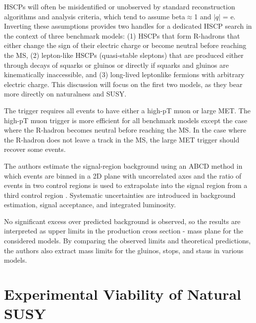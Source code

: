 \documentclass[12pt]{article}
\begin{document}
    HSCPs will often be misidentified or unobserved by standard reconstruction algorithms and analysis criteria, which tend to assume beta$\approx$1 and $|q|$ = e. Inverting these assumptions provides two handles for a dedicated HSCP search in the context of three benchmark models: (1) HSCPs that form R-hadrons that either change the sign of their electric charge or become neutral before reaching the MS, (2) lepton-like HSCPs (quasi-stable sleptons) that are produced either through decays of squarks or gluinos or directly if squarks and gluinos are kinematically inaccessible, and (3) long-lived leptonlike fermions with arbitrary electric charge. This discussion will focus on the first two models, as they bear more directly on naturalness and SUSY.

     

    The trigger requires all events to have either a high-pT muon or large MET. The high-pT muon trigger is more efficient for all benchmark models except the case where the R-hadron becomes neutral before reaching the MS. In the case where the R-hadron does not leave a track in the MS, the large MET trigger should recover some events.  

    The authors estimate the signal-region background using an ABCD method in which events are binned in a 2D plane with uncorrelated axes and the ratio of events in two control regions is used to extrapolate into the signal region from a third control region . Systematic uncertainties are introduced in background estimation, signal acceptance, and integrated luminosity.

    No significant excess over predicted background is observed, so the results are interpreted as upper limits in the production cross section - mass plane for the considered models. By comparing the observed limits and theoretical predictions, the authors also extract mass limits for the gluinos, stops, and staus in various models. 

\section{Experimental Viability of Natural SUSY}
    
\end{document}
